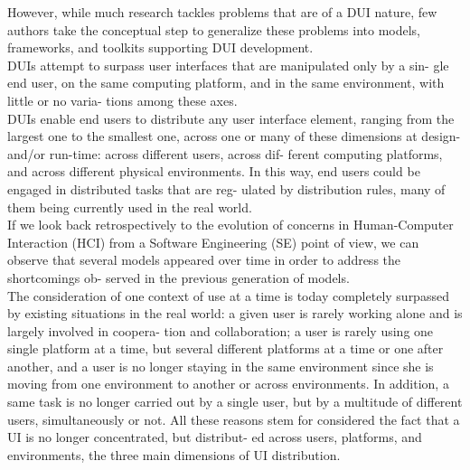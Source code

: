 \cite{elmqvist2011distributed}However, while much research tackles problems
that are of a DUI nature, few authors take the conceptual step to generalize these problems into models,
frameworks, and toolkits supporting DUI development. \\

\cite{vanderdonckt2010distributed} DUIs attempt to surpass user interfaces that
are manipulated only by a sin- gle end user, on the same computing platform, and
in the same environment, with little or no varia- tions among these axes.\\

\cite{vanderdonckt2010distributed} DUIs enable end users to distribute any user
interface element, ranging from the largest one to the smallest one, across one
or many of these dimensions at design- and/or run-time: across different users,
across dif- ferent computing platforms, and across different physical environments. In this way, end users could be engaged in distributed tasks that are reg- ulated by distribution rules, many of them being currently used in the real world. \\

\cite{vanderdonckt2010distributed} If we look back retrospectively to the
evolution of concerns in Human-Computer Interaction (HCI) from a Software
Engineering (SE) point of view, we can observe that several models appeared over
time in order to address the shortcomings ob- served in the previous generation of models.\\

\cite{vanderdonckt2010distributed}The consideration of one context of use at a
time is today completely surpassed by existing situations in the real world: a
given user is rarely working alone and is largely involved in coopera- tion and
collaboration; a user is rarely using one single platform at a time, but several different platforms at a time or one after another, and a user is no longer staying in the same environment since she is moving from one environment to another or across environments. In addition, a same task is no longer carried out by a single user, but by a multitude of different users, simultaneously or not. All these reasons stem for considered the fact that a UI is no longer concentrated, but distribut- ed across users, platforms, and environments, the three main dimensions of UI distribution.\\

